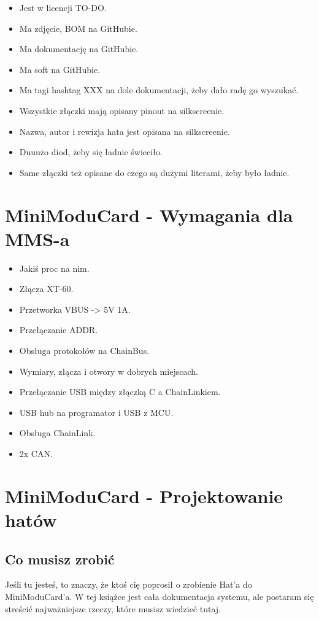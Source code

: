 \documentclass[b5paper, 10pt, twoside]{book}
\begin{document}
\begin{itemize}
  \item Jest w licencji TO-DO. %
  \item Ma zdjęcie, BOM na GitHubie.
  \item Ma dokumentację na GitHubie.
  \item Ma soft na GitHubie.
  \item Ma tagi hashtag XXX na dole dokumentacji, żeby dało radę go wyszukać. %
  \item Wszystkie złączki mają opisany pinout na silkscreenie.
  \item Nazwa, autor i rewizja hata jest opisana na silkscreenie.
  \item Duuużo diod, żeby się ładnie świeciło.
  \item Same złączki też opisane do czego są dużymi literami, żeby było ładnie.
\end{itemize}
\section{MiniModuCard - Wymagania dla MMS-a}
\begin{itemize}
  \item Jakiś proc na nim.
  \item Złącza XT-60.
  \item Przetworka VBUS -> 5V 1A.
  \item Przełączanie ADDR.
  \item Obsługa protokołów na ChainBus.
  \item Wymiary, złącza i otwory w dobrych miejscach.
  \item Przełączanie USB między złączką C a ChainLinkiem.
  \item USB hub na programator i USB z MCU.
  \item Obsługa ChainLink.
  \item 2x CAN.
\end{itemize}
\section{MiniModuCard - Projektowanie hatów} \label{MiniModuCard - Projektowanie hatów}
\subsection{Co musisz zrobić}

Jeśli tu jesteś, to znaczy, że ktoś cię poprosił o zrobienie Hat'a do MiniModuCard'a. W tej książce jest cała dokumentacja systemu, ale postaram się streścić najważniejsze rzeczy, które musisz wiedzieć tutaj.
\end{document}
